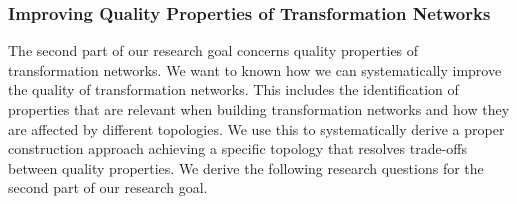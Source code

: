 


\subsubsection*{Improving Quality Properties of Transformation Networks}

The second part of our research goal concerns quality properties of transformation networks.
We want to known how we can systematically improve the quality of transformation networks. 
This includes the identification of properties that are relevant when building transformation networks and how they are affected by different topologies. 
We use this to systematically derive a proper construction approach achieving a specific topology that resolves trade-offs between quality properties. 
We derive the following research questions for the second part of our research goal.

